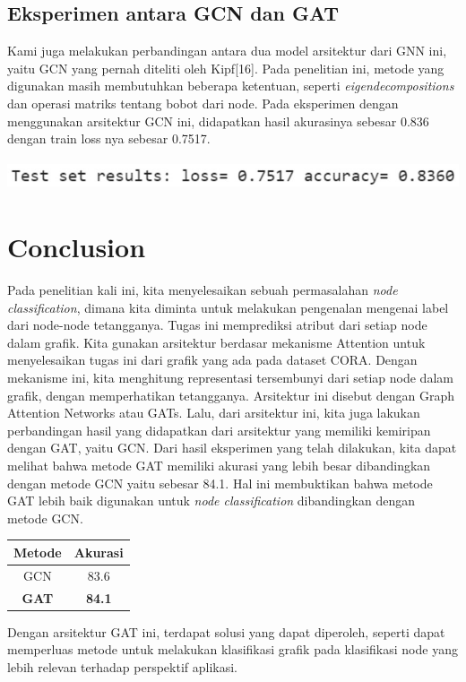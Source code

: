 \documentclass{article}
\begin{document}
\subsection{Eksperimen antara GCN dan GAT}
Kami juga melakukan perbandingan antara dua model arsitektur dari GNN ini, yaitu GCN yang pernah diteliti oleh Kipf[16]. Pada penelitian ini, metode yang digunakan masih membutuhkan beberapa ketentuan, seperti \textit{eigendecompositions} dan operasi matriks tentang bobot dari node. 
Pada eksperimen dengan menggunakan arsitektur GCN ini, didapatkan hasil akurasinya sebesar 0.836 dengan train loss nya sebesar 0.7517.

\begin{center}
\includegraphics[width=6.15625in,height=0.35in]{Picture/Fig12.jpg}
\end{center}

\section{Conclusion}
Pada penelitian kali ini, kita menyelesaikan sebuah permasalahan \textit{node classification}, dimana kita diminta untuk melakukan pengenalan mengenai label dari node-node tetangganya. Tugas ini memprediksi atribut dari setiap node dalam grafik. Kita gunakan arsitektur berdasar mekanisme Attention untuk menyelesaikan tugas ini dari grafik yang ada pada dataset CORA. Dengan mekanisme ini, kita menghitung representasi tersembunyi dari setiap node dalam grafik, dengan memperhatikan tetangganya. Arsitektur ini disebut dengan Graph Attention Networks atau GATs. Lalu, dari arsitektur ini, kita juga lakukan perbandingan hasil yang didapatkan dari arsitektur yang memiliki kemiripan dengan GAT, yaitu GCN. Dari hasil eksperimen yang telah dilakukan, kita dapat melihat bahwa metode GAT memiliki akurasi yang lebih besar dibandingkan dengan metode GCN yaitu sebesar 84.1. Hal ini membuktikan bahwa metode GAT lebih baik digunakan untuk \textit{node classification} dibandingkan dengan metode GCN. 

\begin{center}
    \begin{tabular}{c|c}
    \hline
    \textbf{Metode} & \textbf{Akurasi}\\
    \hline
    {GCN} & {83.6} \\
    \hline
    \textbf{GAT} & \textbf{84.1}
    \end{tabular}
\end{center}

Dengan arsitektur GAT ini, terdapat solusi yang dapat diperoleh, seperti dapat memperluas metode untuk melakukan klasifikasi grafik pada klasifikasi node yang lebih relevan terhadap perspektif aplikasi. 

  
  
\end{document}
